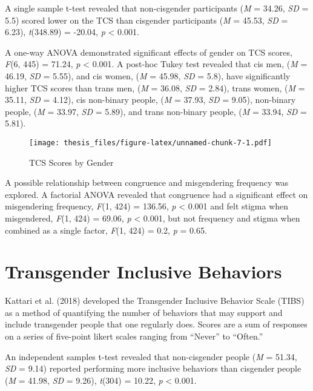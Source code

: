\documentclass[12pt,twoside]{reedthesis}
\begin{document}
A single sample t-test revealed that non-cisgender participants (\emph{M} = 34.26, \emph{SD} = 5.5) scored lower on the TCS than cisgender participants (\emph{M} = 45.53, \emph{SD} = 6.23), \emph{t}(348.89) = -20.04, \emph{p} \textless{} 0.001.

A one-way ANOVA demonstrated significant effects of gender on TCS scores, \emph{F}(6, 445) = 71.24, \emph{p} \textless{} 0.001. A post-hoc Tukey test revealed that cis men, (\emph{M} = 46.19, \emph{SD} = 5.55), and cis women, (\emph{M} = 45.98, \emph{SD} = 5.8), have significantly higher TCS scores than trans men, (\emph{M} = 36.08, \emph{SD} = 2.84), trans women, (\emph{M} = 35.11, \emph{SD} = 4.12), cis non-binary people, (\emph{M} = 37.93, \emph{SD} = 9.05), non-binary people, (\emph{M} = 33.97, \emph{SD} = 5.89), and trans non-binary people, (\emph{M} = 33.94, \emph{SD} = 5.81).
\begin{figure}
\centering
\texttt{[image: thesis\_files/figure-latex/unnamed-chunk-7-1.pdf]}
\caption{\label{fig:unnamed-chunk-7}TCS Scores by Gender}
\end{figure}
A possible relationship between congruence and misgendering frequency was explored. A factorial ANOVA revealed that congruence had a significant effect on misgendering frequency, \emph{F}(1, 424) = 136.56, \emph{p} \textless{} 0.001 and felt stigma when misgendered, \emph{F}(1, 424) = 69.06, \emph{p} \textless{} 0.001, but not frequency and stigma when combined as a single factor, \emph{F}(1, 424) = 0.2, \emph{p} = 0.65.

\hypertarget{transgender-inclusive-behaviors}{%
\section{Transgender Inclusive Behaviors}\label{transgender-inclusive-behaviors}}

Kattari et al. (2018) developed the Transgender Inclusive Behavior Scale (TIBS) as a method of quantifying the number of behaviors that may support and include transgender people that one regularly does. Scores are a sum of responses on a series of five-point likert scales ranging from ``Never'' to ``Often.''

An independent samples t-test revealed that non-cisgender people (\emph{M} = 51.34, \emph{SD} = 9.14) reported performing more inclusive behaviors than cisgender people (\emph{M} = 41.98, \emph{SD} = 9.26), \emph{t}(304) = 10.22, \emph{p} \textless{} 0.001.
\end{document}
